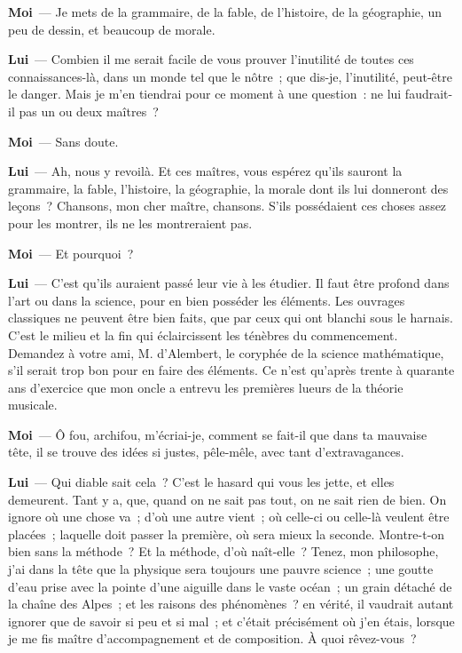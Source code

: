 \documentclass[french,twoside]{book} %
\newcommand{\labelchar}[1]{\textbf{\color{rubric} #1}}
\begin{document}
\labelchar{Moi} — Je mets de la grammaire, de la fable, de l’histoire, de la géographie, un peu de dessin, et beaucoup de morale.\par
\labelchar{Lui} — Combien il me serait facile de vous prouver l’inutilité de toutes ces connaissances-là, dans un monde tel que le nôtre ; que dis-je, l’inutilité, peut-être le danger. Mais je m’en tiendrai pour ce moment à une question : ne lui faudrait-il pas un ou deux maîtres ?\par
\labelchar{Moi} — Sans doute.\par
\labelchar{Lui} — Ah, nous y revoilà. Et ces maîtres, vous espérez qu’ils sauront la grammaire, la fable, l’histoire, la géographie, la morale dont ils lui donneront des leçons ? Chansons, mon cher maître, chansons. S’ils possédaient ces choses assez pour les montrer, ils ne les montreraient pas.\par
\labelchar{Moi} — Et pourquoi ?\par
\labelchar{Lui} — C’est qu’ils auraient passé leur vie à les étudier. Il faut être profond dans l’art ou dans la science, pour en bien posséder les éléments. Les ouvrages classiques ne peuvent être bien faits, que par ceux qui ont blanchi sous le harnais. C’est le milieu et la fin qui éclaircissent les ténèbres du commencement. Demandez à votre ami, M. d’Alembert, le coryphée de la science mathématique, s’il serait trop bon pour en faire des éléments. Ce n’est qu’après trente à quarante ans d’exercice que mon oncle a entrevu les premières lueurs de la théorie musicale.\par
\labelchar{Moi} — Ô fou, archifou, m’écriai-je, comment se fait-il que dans ta mauvaise tête, il se trouve des idées si justes, pêle-mêle, avec tant d’extravagances.\par
\labelchar{Lui} — Qui diable sait cela ? C’est le hasard qui vous les jette, et elles demeurent. Tant y a, que, quand on ne sait pas tout, on ne sait rien de bien. On ignore où une chose va ; d’où une autre vient ; où celle-ci ou celle-là veulent être placées ; laquelle doit passer la première, où sera mieux la seconde. Montre-t-on bien sans la méthode ? Et la méthode, d’où naît-elle ? Tenez, mon philosophe, j’ai dans la tête que la physique sera toujours une pauvre science ; une goutte d’eau prise avec la pointe d’une aiguille dans le vaste océan ; un grain détaché de la chaîne des Alpes ; et les raisons des phénomènes ? en vérité, il vaudrait autant ignorer que de savoir si peu et si mal ; et c’était précisément où j’en étais, lorsque je me fis maître d’accompagnement et de composition. À quoi rêvez-vous ?\par
\end{document}
